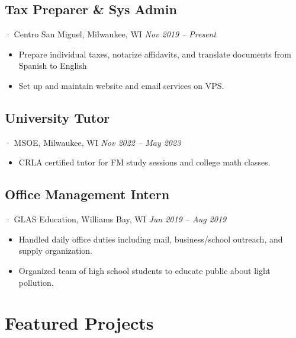 \documentclass[12pt]{article}
\newcommand{\itemspace}{\vspace{0.1870em}}
\begin{document}
\subsection{Tax Preparer \& Sys Admin}
· Centro San Miguel, Milwaukee, WI \hfill \textit{Nov 2019 -- Present}

\begin{itemize}[noitemsep,nolistsep]
  \item Prepare individual taxes, notarize affidavits, and translate documents
    from Spanish to English

  \item Set up and maintain website and email services on VPS.
\end{itemize}

\itemspace

\subsection{University Tutor}
· MSOE, Milwaukee, WI \hfill \textit{Nov 2022 -- May 2023}

\begin{itemize}[noitemsep,nolistsep]
  \item CRLA certified tutor for FM study sessions and college math classes.
\end{itemize}

\itemspace

\subsection{Office Management Intern}
· GLAS Education, Williams Bay, WI  \hfill \textit{Jun 2019 -- Aug 2019}

\begin{itemize}[noitemsep,nolistsep]
  \item Handled daily office duties including mail, business/school outreach,
    and supply organization.

  \item Organized team of high school students to educate public about light
    pollution.
\end{itemize}

\itemspace

\section{Featured Projects}
\end{document}

